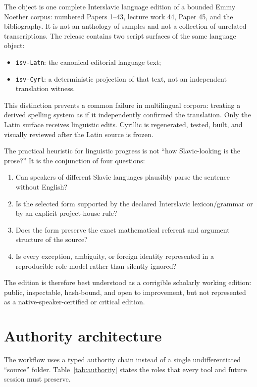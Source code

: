 \documentclass[11pt]{article}
\newcommand{\code}[1]{\texttt{#1}}
\begin{document}
The object is one complete Interslavic language edition of a bounded Emmy Noether corpus: numbered Papers 1--43, lecture work 44, Paper 45, and the bibliography. It is not an anthology of samples and not a collection of unrelated transcriptions. The release contains two script surfaces of the same language object:

\begin{itemize}
\item \code{isv-Latn}: the canonical editorial language text;
\item \code{isv-Cyrl}: a deterministic projection of that text, not an independent translation witness.
\end{itemize}

This distinction prevents a common failure in multilingual corpora: treating a derived spelling system as if it independently confirmed the translation. Only the Latin surface receives linguistic edits. Cyrillic is regenerated, tested, built, and visually reviewed after the Latin source is frozen.

The practical heuristic for linguistic progress is not ``how Slavic-looking is the prose?'' It is the conjunction of four questions:

\begin{enumerate}
\item Can speakers of different Slavic languages plausibly parse the sentence without English?
\item Is the selected form supported by the declared Interslavic lexicon/grammar or by an explicit project-house rule?
\item Does the form preserve the exact mathematical referent and argument structure of the source?
\item Is every exception, ambiguity, or foreign identity represented in a reproducible role model rather than silently ignored?
\end{enumerate}

The edition is therefore best understood as a corrigible scholarly working edition: public, inspectable, hash-bound, and open to improvement, but not represented as a native-speaker-certified or critical edition.

\section{Authority architecture}

The workflow uses a typed authority chain instead of a single undifferentiated ``source'' folder. Table~\ref{tab:authority} states the roles that every tool and future session must preserve.
\end{document}
